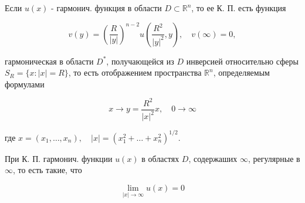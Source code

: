 \documentclass[10pt]{article}
\begin{document}
Если $u(x)$ - гармонич. функция в области $D \subset \mathbb{R}^{n}$, то ее К. П. есть функция



\[

v(y)=\left(\frac{R}{|y|}\right)^{n-2} u\left(\frac{R^{2}}{|y|^{2}}, y\right), \quad v(\infty)=0,

\]



гармоническая в области $D^{*}$, получающейся из $D$ инверсией относительно сферы $S_{R}=\{x:|x|=R\}$, то есть отображением пространства $\mathbb{R}^{n}$, определяемым формулами



\[

x \rightarrow y=\frac{R^{2}}{|x|^{2}} x, \quad 0 \rightarrow \infty

\]



где $x=\left(x_{1}, \ldots, x_{n}\right), \quad|x|=\left(x_{1}^{2}+\ldots+x_{n}^{2}\right)^{1 / 2}$.



При К. П. гармонич. функции $u(x)$ в областях $D$, содержаших $\infty$, регулярные в $\infty$, то есть такие, что



\[

\lim _{|x| \rightarrow \infty} u(x)=0

\]
\end{document}
